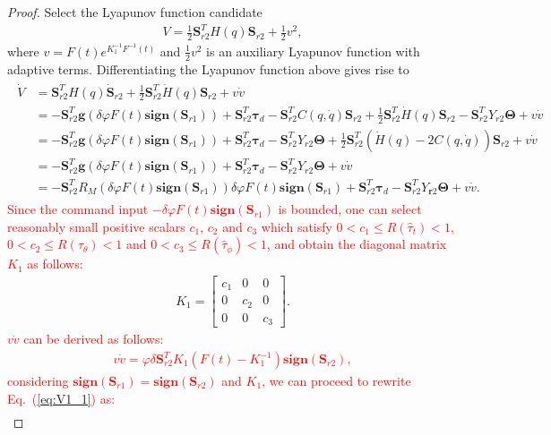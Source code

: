 \documentclass[3p]{elsarticle}
\theoremstyle{plain}
\theoremstyle{remark}
\begin{document}
\begin{proof}
Select the Lyapunov function candidate
\begin{align}
V=\frac{1}{2}\bm S_{r2}^TH(q)\bm S_{r2}+\frac{1}{2}v^2,
\end{align}
where $v=F(t)e^{K_1^{-1}F^{-1}(t)}$ and $\frac{1}{2}v^2$ is an auxiliary Lyapunov function with adaptive terms. Differentiating the Lyapunov function above gives rise to
\begin{align}
\begin{split}
\dot V &= \bm S_{r2}^TH(q)\dot {\bm S}_{r2}+\frac{1}{2}\bm S_{r2}^T\dot H(q)\bm S_{r2}+v\dot v\\
&= -\bm S_{r2}^T\bm{g}(\delta\varphi F(t) \bm{sign}(\bm S_{r1}))+\bm S_{r2}^T\bm\tau_d-\bm S_{r2}^TC(q,\dot q)\bm S_{r2}+\frac{1}{2}\bm S_{r2}^T\dot H(q)\bm S_{r2}-\bm S_{r2}^TY_{r2}\bm\Theta+v\dot v\\
&= -\bm S_{r2}^T\bm{g}(\delta\varphi F(t) \bm{sign}(\bm S_{r1}))+\bm S_{r2}^T\bm\tau_d-\bm S_{r2}^TY_{r2}\bm\Theta+\frac{1}{2}\bm S_{r2}^T(\dot H(q)-2C(q,\dot q))\bm S_{r2}+v\dot v\\
&= -\bm S_{r2}^T\bm{g}(\delta\varphi F(t) \bm{sign}(\bm S_{r1}))+\bm S_{r2}^T\bm\tau_d-\bm S_{r2}^TY_{r2}\bm\Theta+v\dot v\\
&= -\bm S_{r2}^TR_M(\delta\varphi F(t) \bm{sign}(\bm S_{r1}))\delta\varphi F(t) \bm{sign}(\bm S_{r1})+\bm S_{r2}^T\bm\tau_d-\bm S_{r2}^TY_{\bm r2}\bm\Theta+v\dot v.\label{eq:V1_1}
\end{split}
\end{align}
\textcolor{red}{Since the command input $ -\delta\varphi F(t) \bm {sign}(\bm{S}_{r1})$ is bounded, one can select reasonably small positive scalars $c_1$, $c_2$ and $c_3$ which satisfy $0<c_1\le R(\hat\tau_t)<1$, $0<c_2\le R(\hat\tau_\theta)<1$ and $0<c_3\le R(\hat\tau_\phi)<1$, and obtain the diagonal matrix $K_1$ as follows:}
\begin{align}
K_1 = \begin{bmatrix}c_1&0&0\\0&c_2&0\\0&0&c_3\end{bmatrix}.\label{eq:saturated ratio}
\end{align}
\textcolor{red}{$v\dot v$ can be derived as follows:
\begin{align}
v\dot v =\varphi\delta \bm S_{r2}^T K_1(F(t)-K_1^{-1})\bm{sign}(\bm S_{r2}),
\end{align}
considering $\bm{sign}(\bm S_{r1})=\bm{sign}(\bm S_{r2})$ and $K_1$, we can proceed to rewrite Eq.~(\ref{eq:V1_1}) as:
\begin{align}

\end{align}}
\end{proof}
\end{document}
